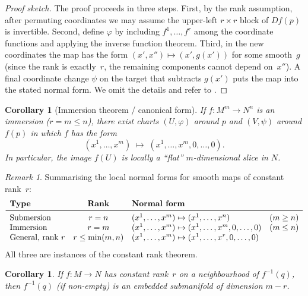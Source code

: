 \documentclass[12pt,a4paper,openany]{book}
\newtheorem{corollary}[theorem]{Corollary}
\theoremstyle{definition}
\theoremstyle{remark}
\newtheorem{remark}[theorem]{Remark}
\begin{document}
\begin{proof}[Proof sketch]
The proof proceeds in three steps.  First, by the rank assumption,
after permuting coordinates we may assume the upper-left $r \times r$
block of $Df(p)$ is invertible.  Second, define $\varphi$ by including
$f^1, \dots, f^r$ among the coordinate functions and applying the
inverse function theorem.  Third, in the new coordinates the map has
the form $(x', x'') \mapsto (x', g(x'))$ for some smooth~$g$ (since
the rank is exactly~$r$, the remaining components cannot depend on~$x''$).
A final coordinate change $\psi$ on the target that subtracts $g(x')$
puts the map into the stated normal form.  We omit the details and refer
to \cite[\S4.12]{Lee2013}.
\end{proof}

\begin{corollary}[Immersion theorem / canonical form]%
\label{cor:immersion-local}%
If $f \colon M^m \to N^n$ is an immersion ($r = m \leq n$), there exist
charts $(U, \varphi)$ around $p$ and $(V, \psi)$ around $f(p)$ in which
$f$ has the form
\[
  (x^1, \dots, x^m) \;\longmapsto\; (x^1, \dots, x^m, 0, \dots, 0).
\]
In particular, the image $f(U)$ is locally a ``flat'' $m$-dimensional
slice in $N$.
\end{corollary}

\begin{remark}\label{rem:local-forms-summary}%
Summarising the local normal forms for smooth maps of constant rank~$r$:
\[
\begin{array}{lcll}
  \textbf{Type} & \textbf{Rank} & \textbf{Normal form} \\
  \midrule
  \text{Submersion} & r = n & (x^1, \dots, x^m) \mapsto (x^1, \dots, x^n)
    & (m \geq n) \\
  \text{Immersion} & r = m & (x^1, \dots, x^m) \mapsto
    (x^1, \dots, x^m, 0, \dots, 0) & (m \leq n) \\
  \text{General, rank $r$} & r \leq \min(m,n) &
    (x^1, \dots, x^m) \mapsto (x^1, \dots, x^r, 0, \dots, 0) & \\
\end{array}
\]
All three are instances of the constant rank theorem.
\end{remark}

\begin{corollary}\label{cor:constant-rank-level-set}%
If $f \colon M \to N$ has constant rank~$r$ on a neighbourhood of
$f^{-1}(q)$, then $f^{-1}(q)$ (if non-empty) is an embedded submanifold
of dimension $m - r$.
\end{corollary}
\end{document}
